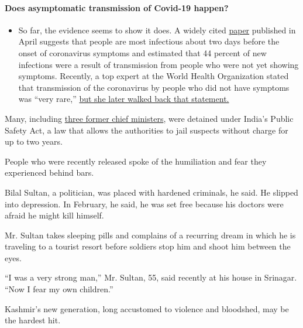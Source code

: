 \begin{itemize}
{  \paragraph{Does asymptomatic transmission of Covid-19
  happen?}\label{does-asymptomatic-transmission-of-covid-19-happen}}

  \begin{itemize}
  \tightlist
  \item
    So far, the evidence seems to show it does. A widely cited
    \href{https://www.nature.com/articles/s41591-020-0869-5}{paper}
    published in April suggests that people are most infectious about
    two days before the onset of coronavirus symptoms and estimated that
    44 percent of new infections were a result of transmission from
    people who were not yet showing symptoms. Recently, a top expert at
    the World Health Organization stated that transmission of the
    coronavirus by people who did not have symptoms was ``very rare,''
    \href{https://www.nytimes.com/2020/06/09/world/coronavirus-updates.html?action=click\&pgtype=Article\&state=default\&region=MAIN_CONTENT_3\&context=storylines_faq\#link-1f302e21}{but
    she later walked back that statement.}
  \end{itemize}
\end{itemize}

Many, including
\href{https://www.outlookindia.com/website/story/six-months-after-detention-prospects-of-3-ex-jk-cms-release-still-bleak/346801}{three
former chief ministers}, were detained under India's Public Safety Act,
a law that allows the authorities to jail suspects without charge for up
to two years.

People who were recently released spoke of the humiliation and fear they
experienced behind bars.

Bilal Sultan, a politician, was placed with hardened criminals, he said.
He slipped into depression. In February, he said, he was set free
because his doctors were afraid he might kill himself.

Mr. Sultan takes sleeping pills and complains of a recurring dream in
which he is traveling to a tourist resort before soldiers stop him and
shoot him between the eyes.

``I was a very strong man,'' Mr. Sultan, 55, said recently at his house
in Srinagar. ``Now I fear my own children.''

Kashmir's new generation, long accustomed to violence and bloodshed, may
be the hardest hit.

